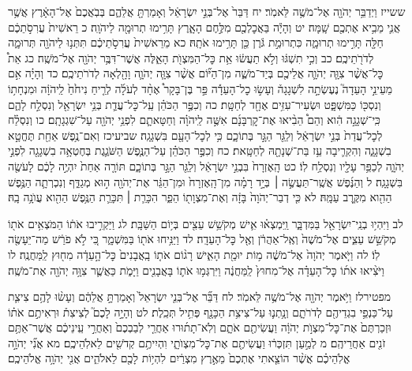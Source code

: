 \documentclass[twoside, openany, parskip=half, 11pt]{book}
\begin{document}
ששייז וַיְדַבֵּ֥ר יְהֹוָ֖ה אֶל־מֹשֶׁ֥ה לֵּאמֹֽר׃ יח דַּבֵּר֙ אֶל־בְּנֵ֣י יִשְׂרָאֵ֔ל וְאָמַרְתָּ֖ אֲלֵהֶ֑ם בְּבֹֽאֲכֶם֙ אֶל־הָאָ֔רֶץ אֲשֶׁ֥ר אֲנִ֛י מֵבִ֥יא אֶתְכֶ֖ם שָֽׁמָּה׃ יט וְהָיָ֕ה בַּאֲכׇלְכֶ֖ם מִלֶּ֣חֶם הָאָ֑רֶץ תָּרִ֥ימוּ תְרוּמָ֖ה לַיהֹוָֽה׃ כ רֵאשִׁית֙ עֲרִסֹ֣תֵכֶ֔ם חַלָּ֖ה תָּרִ֣ימוּ תְרוּמָ֑ה כִּתְרוּמַ֣ת גֹּ֔רֶן כֵּ֖ן תָּרִ֥ימוּ אֹתָֽהּ׃ כא מֵרֵאשִׁית֙ עֲרִסֹ֣תֵיכֶ֔ם תִּתְּנ֥וּ לַיהֹוָ֖ה תְּרוּמָ֑ה לְדֹרֹ֖תֵיכֶֽם׃
כב וְכִ֣י תִשְׁגּ֔וּ וְלֹ֣א תַעֲשׂ֔וּ אֵ֥ת כׇּל־הַמִּצְוֺ֖ת הָאֵ֑לֶּה אֲשֶׁר־דִּבֶּ֥ר יְהֹוָ֖ה אֶל־מֹשֶֽׁה׃ כג אֵת֩ כׇּל־אֲשֶׁ֨ר צִוָּ֧ה יְהֹוָ֛ה אֲלֵיכֶ֖ם בְּיַד־מֹשֶׁ֑ה מִן־הַיּ֞וֹם אֲשֶׁ֨ר צִוָּ֧ה יְהֹוָ֛ה וָהָ֖לְאָה לְדֹרֹתֵיכֶֽם׃ כד וְהָיָ֗ה אִ֣ם מֵעֵינֵ֣י הָעֵדָה֮ נֶעֶשְׂתָ֣ה לִשְׁגָגָה֒ וְעָשׂ֣וּ כׇל־הָעֵדָ֡ה פַּ֣ר בֶּן־בָּקָר֩ אֶחָ֨ד לְעֹלָ֜ה לְרֵ֤יחַ נִיחֹ֙חַ֙ לַֽיהֹוָ֔ה וּמִנְחָת֥וֹ וְנִסְכּ֖וֹ כַּמִּשְׁפָּ֑ט וּשְׂעִיר־עִזִּ֥ים אֶחָ֖ד לְחַטָּֽת׃ כה וְכִפֶּ֣ר הַכֹּהֵ֗ן עַֽל־כׇּל־עֲדַ֛ת בְּנֵ֥י יִשְׂרָאֵ֖ל וְנִסְלַ֣ח לָהֶ֑ם כִּֽי־שְׁגָגָ֣ה הִ֔וא וְהֵם֩ הֵבִ֨יאוּ אֶת־קׇרְבָּנָ֜ם אִשֶּׁ֣ה לַֽיהֹוָ֗ה וְחַטָּאתָ֛ם לִפְנֵ֥י יְהֹוָ֖ה עַל־שִׁגְגָתָֽם׃ כו וְנִסְלַ֗ח לְכׇל־עֲדַת֙ בְּנֵ֣י יִשְׂרָאֵ֔ל וְלַגֵּ֖ר הַגָּ֣ר בְּתוֹכָ֑ם כִּ֥י לְכׇל־הָעָ֖ם בִּשְׁגָגָֽה׃
שביעיכז וְאִם־נֶ֥פֶשׁ אַחַ֖ת תֶּחֱטָ֣א בִשְׁגָגָ֑ה וְהִקְרִ֛יבָה עֵ֥ז בַּת־שְׁנָתָ֖הּ לְחַטָּֽאת׃ כח וְכִפֶּ֣ר הַכֹּהֵ֗ן עַל־הַנֶּ֧פֶשׁ הַשֹּׁגֶ֛גֶת בְּחֶטְאָ֥ה בִשְׁגָגָ֖ה לִפְנֵ֣י יְהֹוָ֑ה לְכַפֵּ֥ר עָלָ֖יו וְנִסְלַ֥ח לֽוֹ׃ כט הָֽאֶזְרָח֙ בִּבְנֵ֣י יִשְׂרָאֵ֔ל וְלַגֵּ֖ר הַגָּ֣ר בְּתוֹכָ֑ם תּוֹרָ֤ה אַחַת֙ יִהְיֶ֣ה לָכֶ֔ם לָעֹשֶׂ֖ה בִּשְׁגָגָֽה׃ ל וְהַנֶּ֜פֶשׁ אֲשֶֽׁר־תַּעֲשֶׂ֣ה ׀ בְּיָ֣ד רָמָ֗ה מִן־הָֽאֶזְרָח֙ וּמִן־הַגֵּ֔ר אֶת־יְהֹוָ֖ה ה֣וּא מְגַדֵּ֑ף וְנִכְרְתָ֛ה הַנֶּ֥פֶשׁ הַהִ֖וא מִקֶּ֥רֶב עַמָּֽהּ׃ לא כִּ֤י דְבַר־יְהֹוָה֙ בָּזָ֔ה וְאֶת־מִצְוָת֖וֹ הֵפַ֑ר הִכָּרֵ֧ת ׀ תִּכָּרֵ֛ת הַנֶּ֥פֶשׁ הַהִ֖וא עֲוֺנָ֥ה בָֽהּ׃

לב וַיִּהְי֥וּ בְנֵֽי־יִשְׂרָאֵ֖ל בַּמִּדְבָּ֑ר וַֽיִּמְצְא֗וּ אִ֛ישׁ מְקֹשֵׁ֥שׁ עֵצִ֖ים בְּי֥וֹם הַשַּׁבָּֽת׃ לג וַיַּקְרִ֣יבוּ אֹת֔וֹ הַמֹּצְאִ֥ים אֹת֖וֹ מְקֹשֵׁ֣שׁ עֵצִ֑ים אֶל־מֹשֶׁה֙ וְאֶֽל־אַהֲרֹ֔ן וְאֶ֖ל כׇּל־הָעֵדָֽה׃ לד וַיַּנִּ֥יחוּ אֹת֖וֹ בַּמִּשְׁמָ֑ר כִּ֚י לֹ֣א פֹרַ֔שׁ מַה־יֵּעָשֶׂ֖ה לֽוֹ׃
לה וַיֹּ֤אמֶר יְהֹוָה֙ אֶל־מֹשֶׁ֔ה מ֥וֹת יוּמַ֖ת הָאִ֑ישׁ רָג֨וֹם אֹת֤וֹ בָֽאֲבָנִים֙ כׇּל־הָ֣עֵדָ֔ה מִח֖וּץ לַֽמַּחֲנֶֽה׃ לו וַיֹּצִ֨יאוּ אֹת֜וֹ כׇּל־הָעֵדָ֗ה אֶל־מִחוּץ֙ לַֽמַּחֲנֶ֔ה וַיִּרְגְּמ֥וּ אֹת֛וֹ בָּאֲבָנִ֖ים וַיָּמֹ֑ת כַּאֲשֶׁ֛ר צִוָּ֥ה יְהֹוָ֖ה אֶת־מֹשֶֽׁה׃

מפטירלז וַיֹּ֥אמֶר יְהֹוָ֖ה אֶל־מֹשֶׁ֥ה לֵּאמֹֽר׃ לח דַּבֵּ֞ר אֶל־בְּנֵ֤י יִשְׂרָאֵל֙ וְאָמַרְתָּ֣ אֲלֵהֶ֔ם וְעָשׂ֨וּ לָהֶ֥ם צִיצִ֛ת עַל־כַּנְפֵ֥י בִגְדֵיהֶ֖ם לְדֹרֹתָ֑ם וְנָ֥תְנ֛וּ עַל־צִיצִ֥ת הַכָּנָ֖ף פְּתִ֥יל תְּכֵֽלֶת׃ לט וְהָיָ֣ה לָכֶם֮ לְצִיצִת֒ וּרְאִיתֶ֣ם אֹת֗וֹ וּזְכַרְתֶּם֙ אֶת־כׇּל־מִצְוֺ֣ת יְהֹוָ֔ה וַעֲשִׂיתֶ֖ם אֹתָ֑ם וְלֹֽא־תָת֜וּרוּ אַחֲרֵ֤י לְבַבְכֶם֙ וְאַחֲרֵ֣י עֵֽינֵיכֶ֔ם אֲשֶׁר־אַתֶּ֥ם זֹנִ֖ים אַחֲרֵיהֶֽם׃ מ לְמַ֣עַן תִּזְכְּר֔וּ וַעֲשִׂיתֶ֖ם אֶת־כׇּל־מִצְוֺתָ֑י וִהְיִיתֶ֥ם קְדֹשִׁ֖ים לֵאלֹֽהֵיכֶֽם׃ מא אֲנִ֞י יְהֹוָ֣ה אֱלֹֽהֵיכֶ֗ם אֲשֶׁ֨ר הוֹצֵ֤אתִי אֶתְכֶם֙ מֵאֶ֣רֶץ מִצְרַ֔יִם לִהְי֥וֹת לָכֶ֖ם לֵאלֹהִ֑ים אֲנִ֖י יְהֹוָ֥ה אֱלֹהֵיכֶֽם׃
\end{document}
